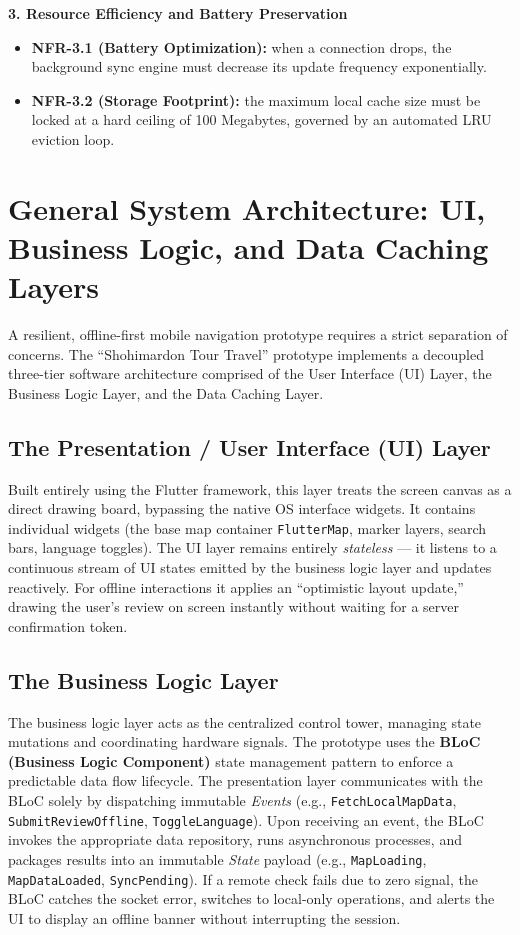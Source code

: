 \documentclass[12pt,a4paper,oneside]{report}
\begin{document}
\textbf{3. Resource Efficiency and Battery Preservation}
\begin{itemize}[leftmargin=1.4em]
  \item \textbf{NFR-3.1 (Battery Optimization):} when a connection drops, the background
        sync engine must decrease its update frequency exponentially.
  \item \textbf{NFR-3.2 (Storage Footprint):} the maximum local cache size must be locked
        at a hard ceiling of 100 Megabytes, governed by an automated LRU eviction loop.
\end{itemize}

\section{General System Architecture: UI, Business Logic, and Data Caching Layers}

A resilient, offline-first mobile navigation prototype requires a strict separation of
concerns. The ``Shohimardon Tour Travel'' prototype implements a decoupled three-tier
software architecture comprised of the User Interface (UI) Layer, the Business Logic
Layer, and the Data Caching Layer.

\subsection{The Presentation / User Interface (UI) Layer}

Built entirely using the Flutter framework, this layer treats the screen canvas as a
direct drawing board, bypassing the native OS interface widgets. It contains individual
widgets (the base map container \texttt{FlutterMap}, marker layers, search bars, language
toggles). The UI layer remains entirely \emph{stateless} --- it listens to a continuous
stream of UI states emitted by the business logic layer and updates reactively. For
offline interactions it applies an ``optimistic layout update,'' drawing the user's review
on screen instantly without waiting for a server confirmation token.

\subsection{The Business Logic Layer}

The business logic layer acts as the centralized control tower, managing state mutations
and coordinating hardware signals. The prototype uses the \textbf{BLoC (Business Logic
Component)} state management pattern to enforce a predictable data flow lifecycle. The
presentation layer communicates with the BLoC solely by dispatching immutable
\emph{Events} (e.g., \texttt{FetchLocalMapData}, \texttt{SubmitReviewOffline},
\texttt{ToggleLanguage}). Upon receiving an event, the BLoC invokes the appropriate data
repository, runs asynchronous processes, and packages results into an immutable
\emph{State} payload (e.g., \texttt{MapLoading}, \texttt{MapDataLoaded},
\texttt{SyncPending}). If a remote check fails due to zero signal, the BLoC catches the
socket error, switches to local-only operations, and alerts the UI to display an offline
banner without interrupting the session.
\end{document}
